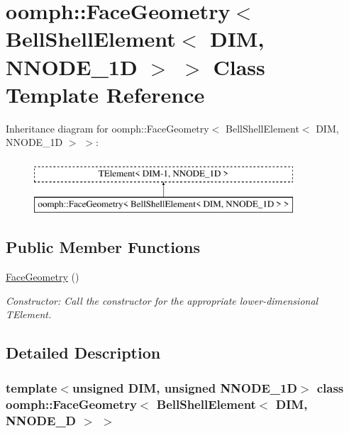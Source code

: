 \hypertarget{classoomph_1_1FaceGeometry_3_01BellShellElement_3_01DIM_00_01NNODE__1D_01_4_01_4}{}\section{oomph\+:\+:Face\+Geometry$<$ Bell\+Shell\+Element$<$ D\+IM, N\+N\+O\+D\+E\+\_\+1D $>$ $>$ Class Template Reference}
\label{classoomph_1_1FaceGeometry_3_01BellShellElement_3_01DIM_00_01NNODE__1D_01_4_01_4}
Inheritance diagram for oomph\+:\+:Face\+Geometry$<$ Bell\+Shell\+Element$<$ D\+IM, N\+N\+O\+D\+E\+\_\+1D $>$ $>$\+:\begin{figure}[H]
\begin{center}
\leavevmode
\includegraphics[height=2.000000cm]{classoomph_1_1FaceGeometry_3_01BellShellElement_3_01DIM_00_01NNODE__1D_01_4_01_4}
\end{center}
\end{figure}
\subsection*{Public Member Functions}
\begin{DoxyCompactItemize}
\item 
\hyperlink{classoomph_1_1FaceGeometry_3_01BellShellElement_3_01DIM_00_01NNODE__1D_01_4_01_4_ae3b9e81d2729d8b818c563812e8cf8f9}{Face\+Geometry} ()
\begin{DoxyCompactList}\small\item\em Constructor\+: Call the constructor for the appropriate lower-\/dimensional T\+Element. \end{DoxyCompactList}\end{DoxyCompactItemize}


\subsection{Detailed Description}
\subsubsection*{template$<$unsigned D\+IM, unsigned N\+N\+O\+D\+E\+\_\+1D$>$\newline
class oomph\+::\+Face\+Geometry$<$ Bell\+Shell\+Element$<$ D\+I\+M, N\+N\+O\+D\+E\+\_\+D $>$ $>$}

